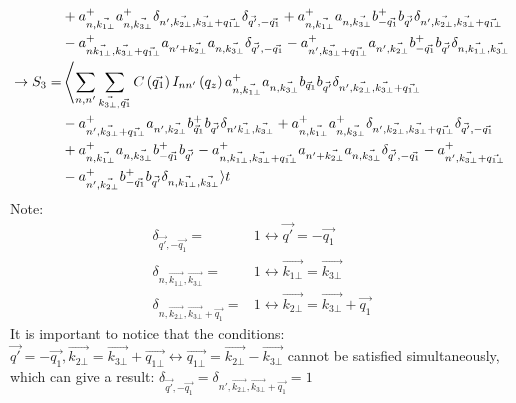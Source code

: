 \documentclass{article}
\begin{document}
\begin{align*}
    & + a^+_{n,\vec{k_{1\bot}}}a^+_{n,\vec{k_{3\bot}}}\delta_{n',\vec{k_{2\bot}},\vec{k_{3\bot}}+\vec{q_{1\bot}}}\delta_{\vec{q'},-\vec{q_{1}}}+a^+_{n,\vec{k_{1\bot}}}a_{n,\vec{k_{3\bot}}}b^+_{-\vec{q_{1}}}b_{\vec{q'}}\delta_{n',\vec{k_{2\bot}},\vec{k_{3\bot}}+\vec{q_{1\bot}}} \\
     & - a^+_{n\vec{k_{1\bot}},\vec{k_{3 \bot}}+\vec{q_{1 \bot}}}a_{n'+\vec{k_{2 \bot}}}a_{n,\vec{k_{3 \bot}}}\delta_{\vec{q'},-\vec{q_{1}}}-a^+_{n',\vec{k_{3 \bot}}+\vec{q_{1 \bot}}}a_{n',\vec{k_{2 \bot}}}b^+_{-\vec{q_{1}}}b_{\vec{q'}}\delta_{n,\vec{k_{1 \bot}},\vec{k_{3 \bot}}} \\
    \rightarrow S_3 =&  \left \langle \sum_{n,n'} \sum_{\vec{k_{3\bot,}}\vec{q_1}}C\left(\vec{q_1}\right)I_{nn'}\left(q_z\right)a^+_{n, \vec{k_{1\bot}}} a_{n, \vec{k_{3\bot}}} b_{\vec{q}_{1}} b_{\vec{q'}} \delta_{n', \vec{k_{2\bot}}, \vec{k_{3\bot}} + \vec{q_{1 \bot}}}\right. \notag \\
     & - a^+_{n', \vec{k_{3 \bot}} + \vec{q_{1\bot}}}a_{n', \vec{k_{2\bot}}} b^+_{\vec{q}_1} b_{\vec{q'}} \delta_{n'\vec{k_\bot}, \vec{k_{3\bot}}}+ a^+_{n,\vec{k_{1\bot}}}a^+_{n,\vec{k_{3\bot}}}\delta_{n',\vec{k_{2\bot}},\vec{k_{3\bot}}+\vec{q_{1\bot}}}\delta_{\vec{q'},-\vec{q_{1}}} \\
    & +a^+_{n,\vec{k_{1\bot}}}a_{n,\vec{k_{3\bot}}}b^+_{-\vec{q_{1}}}b_{\vec{q'}}- a^+_{n,\vec{k_{1\bot}},\vec{k_{3 \bot}}+\vec{q_{1 \bot}}}a_{n'+\vec{k_{2 \bot}}}a_{n,\vec{k_{3 \bot}}}\delta_{\vec{q'},-\vec{q_{1}}}-a^+_{n',\vec{k_{3 \bot}}+\vec{q_{1 \bot}}} \\
    & -a^+_{n',\vec{k_{2 \bot}}}b^+_{-\vec{q_{1}}}b_{\vec{q'}}\delta_{n,\vec{k_{1 \bot}},\vec{k_{3 \bot}}}\rangle t
\end{align*}
Note:
\begin{align*}
    \delta_{\vec{q'}, -\vec{q_1}}= & 1 \leftrightarrow \vec{q'}= -\vec{q_1} \\
    \delta_{n, \vec{k_{1\bot}}, \vec{k_{3\bot}}}=& 1 \leftrightarrow \vec{k_{1\bot}} = \vec{k_{3\bot}}\\
    \delta_{n, \vec{k_{2\bot}}, \vec{k_{3\bot}} + \vec{q_1}}= & 1 \leftrightarrow \vec{k_{2\bot}} = \vec{k_{3\bot}} + \vec{q_1}
\end{align*}
It is important to notice that the conditions: $\vec{q'}= -\vec{q_1}, \vec{k_{2\bot}}=\vec{k_{3\bot}}+\vec{q_{1\bot}}\leftrightarrow\vec{q_{1\bot}}=\vec{k_{2\bot}}-\vec{k_{3\bot}}$ cannot be satisfied simultaneously, which can give a result: $\delta_{\vec{q'},-\vec{q_1}}= \delta_{n', \vec{k_{2\bot}}, \vec{k_{3\bot}}+ \vec{q_1}} =1$
\end{document}
